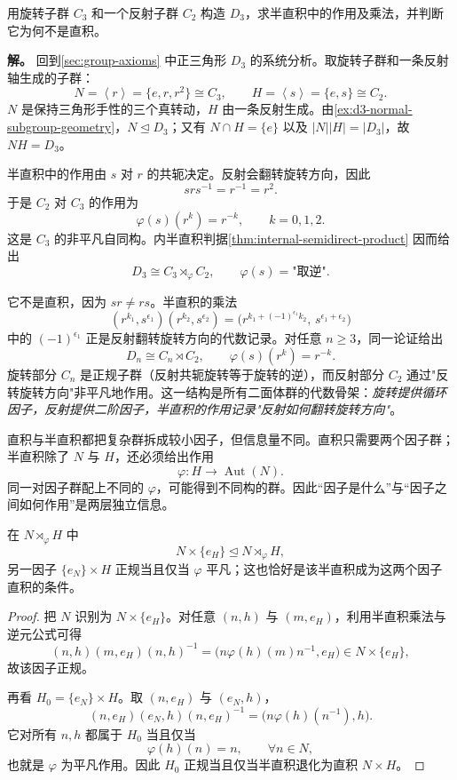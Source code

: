 \begin{example}
用旋转子群 $C_3$ 和一个反射子群 $C_2$ 构造 $D_3$，求半直积中的作用及乘法，并判断它为何不是直积。

\textbf{解。} 回到\cref{sec:group-axioms} 中正三角形 $D_3$ 的系统分析。取旋转子群和一条反射轴生成的子群：
\[
N=\left\langle r\right\rangle=\{e,r,r^2\}\cong C_3,
\qquad
H=\left\langle s\right\rangle=\{e,s\}\cong C_2.
\]
$N$ 是保持三角形手性的三个真转动，$H$ 由一条反射生成。由\cref{ex:d3-normal-subgroup-geometry}，$N\mathrel{\trianglelefteq} D_3$；又有 $N\cap H=\{e\}$ 以及 $|N||H|=|D_3|$，故 $NH=D_3$。

半直积中的作用由 $s$ 对 $r$ 的共轭决定。反射会翻转旋转方向，因此
\[
srs^{-1}=r^{-1}=r^2.
\]
于是 $C_2$ 对 $C_3$ 的作用为
\[
\varphi(s)(r^k)=r^{-k},
\qquad k=0,1,2.
\]
这是 $C_3$ 的非平凡自同构。内半直积判据\cref{thm:internal-semidirect-product} 因而给出
\[
D_3\cong C_3\rtimes_\varphi C_2,
\qquad
\varphi(s)=\text{"取逆"}.
\]

它不是直积，因为 $sr\neq rs$。半直积的乘法
\[
(r^{k_1},s^{\epsilon_1})(r^{k_2},s^{\epsilon_2})
=\bigl(r^{k_1+(-1)^{\epsilon_1}k_2},\,s^{\epsilon_1+\epsilon_2}\bigr)
\]
中的 $(-1)^{\epsilon_1}$ 正是反射翻转旋转方向的代数记录。对任意 $n\geq3$，同一论证给出
\[
D_n\cong C_n\rtimes C_2,
\qquad
\varphi(s)(r^k)=r^{-k}.
\]
旋转部分 $C_n$ 是正规子群（反射共轭旋转等于旋转的逆），而反射部分 $C_2$ 通过"反转旋转方向"非平凡地作用。这一结构是所有二面体群的代数骨架：\emph{旋转提供循环因子，反射提供二阶因子，半直积的作用记录"反射如何翻转旋转方向"}。
\end{example}

直积与半直积都把复杂群拆成较小因子，但信息量不同。直积只需要两个因子群；半直积除了 $N$ 与 $H$，还必须给出作用
\[
\varphi:H\to\operatorname{Aut}(N).
\]
同一对因子群配上不同的 $\varphi$，可能得到不同构的群。因此“因子是什么”与“因子之间如何作用”是两层独立信息。

\begin{proposition}[半直积中的正规因子]
在 $N\rtimes_\varphi H$ 中
\[
N\times\{e_H\}\mathrel{\trianglelefteq} N\rtimes_\varphi H,
\]
另一因子 $\{e_N\}\times H$ 正规当且仅当 $\varphi$ 平凡；这也恰好是该半直积成为这两个因子直积的条件。
\end{proposition}

\begin{proof}
把 $N$ 识别为 $N\times\{e_H\}$。对任意 $(n,h)$ 与 $(m,e_H)$，利用半直积乘法与逆元公式可得
\[
(n,h)(m,e_H)(n,h)^{-1}
=\bigl(n\varphi(h)(m)n^{-1},e_H\bigr)\in N\times\{e_H\},
\]
故该因子正规。

再看 $H_0=\{e_N\}\times H$。取 $(n,e_H)$ 与 $(e_N,h)$，
\[
(n,e_H)(e_N,h)(n,e_H)^{-1}
=\bigl(n\varphi(h)(n^{-1}),h\bigr).
\]
它对所有 $n,h$ 都属于 $H_0$ 当且仅当
\[
\varphi(h)(n)=n,
\qquad \forall n\in N,
\]
也就是 $\varphi$ 为平凡作用。因此 $H_0$ 正规当且仅当半直积退化为直积 $N\times H$。
\end{proof}

